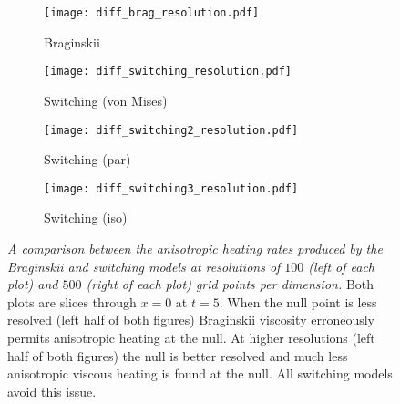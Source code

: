 \begin{figure}[t]
    \hfill
    \begin{subfigure}{0.49\textwidth}
      \centering
      \texttt{[image: diff\_brag\_resolution.pdf]}
      \caption{Braginskii}%
      \label{fig:diff_brag_resolution}
    \end{subfigure}
    \hfill
    \begin{subfigure}{0.49\textwidth}
      \texttt{[image: diff\_switching\_resolution.pdf]}
      \caption{Switching (von Mises)}%
      \label{fig:diff_switching_resolution}
    \end{subfigure}
    \hfill
    \begin{subfigure}{0.49\textwidth}
      \texttt{[image: diff\_switching2\_resolution.pdf]}
      \caption{Switching (par)}%
      \label{fig:diff_switching2_resolution}
    \end{subfigure}
    \hfill
    \begin{subfigure}{0.49\textwidth}
      \texttt{[image: diff\_switching3\_resolution.pdf]}
      \caption{Switching (iso)}%
      \label{fig:diff_switching3_resolution}
    \end{subfigure}

    \caption{\emph{A comparison between the anisotropic heating rates produced by the Braginskii and switching models at resolutions of $100$ (left of each plot) and $500$ (right of each plot) grid points per dimension.} Both plots are slices through $x=0$ at $t=5$. When the null point is less resolved (left half of both figures) Braginskii viscosity erroneously permits anisotropic heating at the null. At higher resolutions (left half of both figures) the null is better resolved and much less anisotropic viscous heating is found at the null. All switching models avoid this issue.}
\label{fig:anisotropy_bleeding}%
\end{figure}

